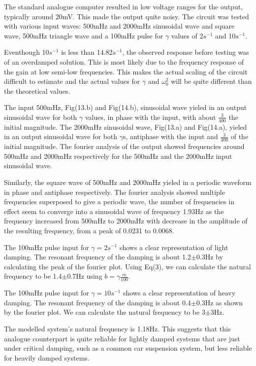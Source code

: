 \documentclass[journal]{Imperial_lab_report}
\begin{document}
    The standard analogue computer resulted in low voltage ranges for the output, typically around 20mV. This made the output quite noisy. The circuit was tested with various input waves: 500mHz and 2000mHz sinusoidal wave and square wave, 500mHz triangle wave and a 100mHz pulse for $\gamma$ values of 2$s^{-1}$ and 10$s^{-1}$. 

    Eventhough 10$s^{-1}$ is less than 14.82$s^{-1}$, the observed response before testing was of an overdamped solution. This is most likely due to the frequency response of the gain at low semi-low frequencies. This makes the actual scaling of the circuit difficult to estimate and the actual values for $\gamma$ and $\omega_{0}^2$ will be quite different than the theoretical values.
    
    The input 500mHz, Fig(13.b) and Fig(14.b), sinusoidal wave yieled in an output sinusoidal wave for both $\gamma$ values, in phase with the input, with about $\frac{3}{400}$ the initial magnitude.  The 2000mHz sinusoidal wave, Fig(13.a) and Fig(14.a), yieled in an output sinusoidal wave for both $\gamma$s, antiphase with the input and $\frac{3}{400}$ of the initial magnitude. The fourier analysis of the output showed frequencies around 500mHz and 2000mHz respectively for the 500mHz and the 2000mHz input sinusoidal wave.

    Similarly, the square wave of 500mHz and 2000mHz yieled in a periodic waveform in phase and antiphase respectively. The fourier analysis showed multiple frequencies superposed to give a periodic wave, the number of frequencies in effect seem to converge into a sinusoidal wave of frequency 1.93Hz as the frequency increased from 500mHz to 2000mHz with decrease in the amplitude of the resulting frequency, from a peak of 0.0231 to 0.0068. 

    The 100mHz pulse input for $\gamma = 2$$s^{-1}$ shows a clear representation of light damping. The resonant frequency of the damping is about 1.2$\pm$0.3Hz by calculating the peak of the fourier plot. Using Eq(3), we can calculate the natural frequency to be 1.4$\pm$0.7Hz using $b = {\gamma}\frac{m}{100}$.

    The 100mHz pulse input for $\gamma = 10$$s^{-1}$ shows a clear representation of heavy damping. The resonant frequency of the damping is about 0.4$\pm$0.3Hz as shown by the fourier plot. We can calculate the natural frequency to be 3$\pm$3Hz. 

    The modelled system's natural frequency is 1.18Hz. This suggests that this analogue counterpart is quite reliable for lightly damped systems that are just under critical damping, such as a common car suspension system, but less reliable for heavily damped systems.
\end{document}
